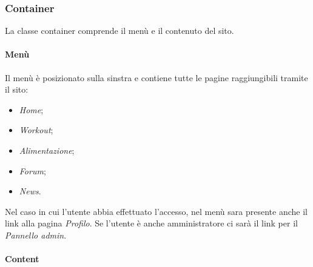 \subsubsection{Container}
La classe container comprende il menù e il contenuto del sito.
\paragraph{Menù}
Il menù è posizionato sulla sinstra e contiene tutte le pagine raggiungibili tramite il sito:
\begin{itemize}
	\item \textit{Home};
	\item \textit{Workout};
	\item \textit{Alimentazione};
	\item \textit{Forum};
	\item \textit{News}.
\end{itemize}
Nel caso in cui l'utente abbia effettuato l'accesso, nel menù sara presente anche il link alla pagina \textit{Profilo}. Se l'utente è anche amministratore ci sarà il link per il \textit{Pannello admin}.
\paragraph{Content}